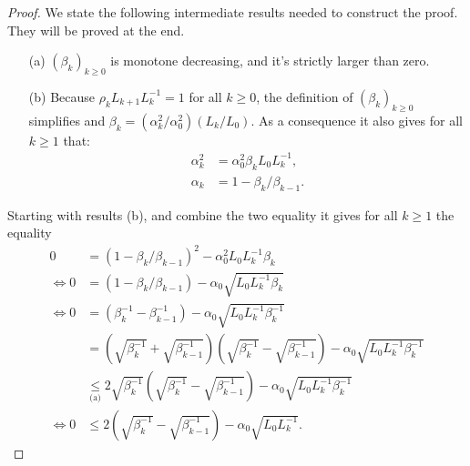 \documentclass[12pt]{report}
\begin{document}
        \begin{proof}
            We state the following intermediate results needed to construct the proof. 
            They will be proved at the end. 
            \begin{enumerate}
                \item[(a)] $(\beta_k)_{k \ge 0}$ is monotone decreasing, and it's strictly larger than zero. 
                \item[(b)] Because $\rho_{k}L_{k + 1}L_k^{-1} = 1$ for all $k \ge 0$, the definition of $(\beta_k)_{k\ge 0}$ simplifies and $\beta_k = (\alpha_k^2/\alpha_0^2)(L_k/L_0)$. As a consequence it also gives for all $k \ge 1$ that: 
                \begin{align*}
                    \alpha_k^2 &= \alpha_0^2\beta_kL_0L_k^{-1},
                    \\
                    \alpha_k &= 1 - \beta_k / \beta_{k - 1}. 
                \end{align*}
            \end{enumerate}
            Starting with results (b), and combine the two equality it gives for all $k \ge 1$ the equality 
            \begin{align*}
                0 &=
                (1 - \beta_k/\beta_{k - 1})^2 - \alpha_0^2L_0L_k^{-1}\beta_k 
                \\
                \iff 
                0 &= 
                (1 - \beta_k/\beta_{k - 1}) - \alpha_0\sqrt{L_0L_k^{-1}\beta_k}
                \\
                \iff 
                0 &= 
                (\beta_k^{-1} - \beta_{k - 1}^{-1}) - \alpha_0 \sqrt{L_0 L_k^{-1}\beta_k^{-1}}
                \\
                &= \left(
                    \sqrt{\beta_k^{-1}} + \sqrt{\beta_{k - 1}^{-1}}
                \right)\left(
                    \sqrt{\beta_k^{-1}} - \sqrt{\beta_{k - 1}^{-1}}
                \right)
                - \alpha_0 \sqrt{L_0L_k^{-1}\beta_k^{-1}}
                \\
                &\underset{\text{(a)}}{\le} 
                2\sqrt{\beta_k^{-1}}\left(
                    \sqrt{\beta_k^{-1}} - \sqrt{\beta_{k - 1}^{-1}}
                \right) - \alpha_0 \sqrt{L_0L_k^{-1}\beta_k^{-1}}
                \\
                \iff
                0 &\le 
                2\left(
                    \sqrt{\beta_k^{-1}} - \sqrt{\beta_{k - 1}^{-1}} 
                \right) - \alpha_0 \sqrt{L_0L_k^{-1}}. 

\end{align*}
\end{proof}
\end{document}
